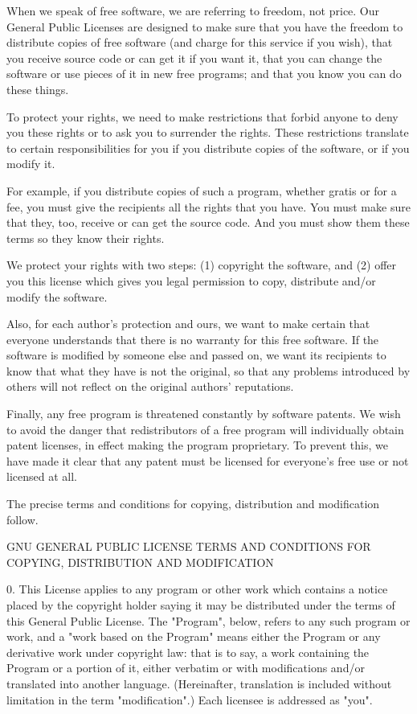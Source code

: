 When we speak of free software, we are referring to freedom, not
price.  Our General Public Licenses are designed to make sure that you
have the freedom to distribute copies of free software (and charge for
this service if you wish), that you receive source code or can get it
if you want it, that you can change the software or use pieces of it
in new free programs; and that you know you can do these things.

To protect your rights, we need to make restrictions that forbid
anyone to deny you these rights or to ask you to surrender the rights.
These restrictions translate to certain responsibilities for you if you
distribute copies of the software, or if you modify it.

For example, if you distribute copies of such a program, whether
gratis or for a fee, you must give the recipients all the rights that
you have.  You must make sure that they, too, receive or can get the
source code.  And you must show them these terms so they know their
rights.

We protect your rights with two steps: (1) copyright the software, and
(2) offer you this license which gives you legal permission to copy,
distribute and/or modify the software.

Also, for each author's protection and ours, we want to make certain
that everyone understands that there is no warranty for this free
software.  If the software is modified by someone else and passed on, we
want its recipients to know that what they have is not the original, so
that any problems introduced by others will not reflect on the original
authors' reputations.

Finally, any free program is threatened constantly by software
patents.  We wish to avoid the danger that redistributors of a free
program will individually obtain patent licenses, in effect making the
program proprietary.  To prevent this, we have made it clear that any
patent must be licensed for everyone's free use or not licensed at all.

The precise terms and conditions for copying, distribution and
modification follow.

GNU GENERAL PUBLIC LICENSE
TERMS AND CONDITIONS FOR COPYING, DISTRIBUTION AND MODIFICATION

0. This License applies to any program or other work which contains
a notice placed by the copyright holder saying it may be distributed
under the terms of this General Public License.  The "Program", below,
refers to any such program or work, and a "work based on the Program"
means either the Program or any derivative work under copyright law:
that is to say, a work containing the Program or a portion of it,
either verbatim or with modifications and/or translated into another
language.  (Hereinafter, translation is included without limitation in
the term "modification".)  Each licensee is addressed as "you".

